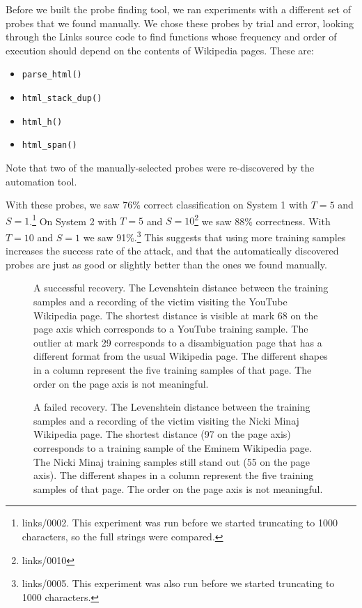 \documentclass[letterpaper,twocolumn,10pt]{article}
\begin{document}
Before we built the probe finding tool, we ran experiments with a different set
of probes that we found manually. We chose these probes by trial and error,
looking through the Links source code to find functions whose frequency and
order of execution should depend on the contents of Wikipedia pages. These are:

\begin{itemize}
\setlength{\itemsep}{0pt}
    \item \texttt{parse\_html()}
    \item \texttt{html\_stack\_dup()}
    \item \texttt{html\_h()}
    \item \texttt{html\_span()}
\end{itemize}

Note that two of the manually-selected probes were re-discovered by the
automation tool.

With these probes, we saw 76\% correct classification on System 1 with $T=5$ and
$S=1$.\footnote{links/0002. This experiment was run before we started truncating
to 1000 characters, so the full strings were compared.} On System 2 with $T=5$
and $S=10$\footnote{links/0010} we saw 88\% correctness. With $T=10$ and $S=1$
we saw 91\%.\footnote{links/0005. This experiment was also run before we started
truncating to 1000 characters.} This suggests that using more training samples
increases the success rate of the attack, and that the automatically discovered
probes are just as good or slightly better than the ones we found manually.

\begin{figure*}
    \centering
    
    \caption{A successful recovery. The Levenshtein distance between the
    training samples and a recording of the victim visiting the YouTube
    Wikipedia page. The shortest distance is visible at mark 68 on the page axis
    which corresponds to a YouTube training sample. The outlier at mark 29
    corresponds to a disambiguation page that has a different format from the
usual Wikipedia page. The different shapes in a column represent the five
training samples of that page. The order on the page axis is not meaningful.}
    \label{figure:youtube}
\end{figure*}

\begin{figure*}
    \centering
    
    \caption{A failed recovery. The Levenshtein distance between the training samples and
        a recording of the victim visiting the Nicki Minaj Wikipedia page. The
        shortest distance (97 on the page axis) corresponds to a training sample
        of the Eminem Wikipedia page. The Nicki Minaj training samples still
        stand out (55 on the page axis). The different shapes in a column
        represent the five training samples of that page. The order on the page
        axis is not meaningful.}
    \label{figure:minaj}
\end{figure*}
\end{document}
